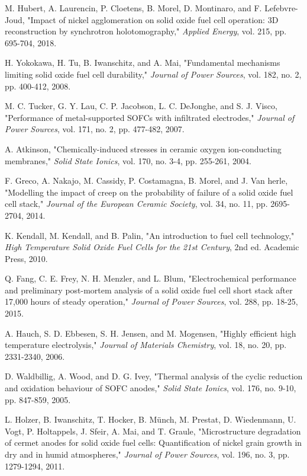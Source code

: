 \documentclass[conference]{IEEEtran}
\begin{document}
\begin{thebibliography}{99}
M. Hubert, A. Laurencin, P. Cloetens, B. Morel, D. Montinaro, and F. Lefebvre-Joud, "Impact of nickel agglomeration on solid oxide fuel cell operation: 3D reconstruction by synchrotron holotomography," \textit{Applied Energy}, vol. 215, pp. 695-704, 2018.

H. Yokokawa, H. Tu, B. Iwanschitz, and A. Mai, "Fundamental mechanisms limiting solid oxide fuel cell durability," \textit{Journal of Power Sources}, vol. 182, no. 2, pp. 400-412, 2008.

M. C. Tucker, G. Y. Lau, C. P. Jacobson, L. C. DeJonghe, and S. J. Visco, "Performance of metal-supported SOFCs with infiltrated electrodes," \textit{Journal of Power Sources}, vol. 171, no. 2, pp. 477-482, 2007.

A. Atkinson, "Chemically-induced stresses in ceramic oxygen ion-conducting membranes," \textit{Solid State Ionics}, vol. 170, no. 3-4, pp. 255-261, 2004.

F. Greco, A. Nakajo, M. Cassidy, P. Costamagna, B. Morel, and J. Van herle, "Modelling the impact of creep on the probability of failure of a solid oxide fuel cell stack," \textit{Journal of the European Ceramic Society}, vol. 34, no. 11, pp. 2695-2704, 2014.

K. Kendall, M. Kendall, and B. Palin, "An introduction to fuel cell technology," \textit{High Temperature Solid Oxide Fuel Cells for the 21st Century}, 2nd ed. Academic Press, 2010.

Q. Fang, C. E. Frey, N. H. Menzler, and L. Blum, "Electrochemical performance and preliminary post-mortem analysis of a solid oxide fuel cell short stack after 17,000 hours of steady operation," \textit{Journal of Power Sources}, vol. 288, pp. 18-25, 2015.

A. Hauch, S. D. Ebbesen, S. H. Jensen, and M. Mogensen, "Highly efficient high temperature electrolysis," \textit{Journal of Materials Chemistry}, vol. 18, no. 20, pp. 2331-2340, 2006.

D. Waldbillig, A. Wood, and D. G. Ivey, "Thermal analysis of the cyclic reduction and oxidation behaviour of SOFC anodes," \textit{Solid State Ionics}, vol. 176, no. 9-10, pp. 847-859, 2005.

L. Holzer, B. Iwanschitz, T. Hocker, B. Münch, M. Prestat, D. Wiedenmann, U. Vogt, P. Holtappels, J. Sfeir, A. Mai, and T. Graule, "Microstructure degradation of cermet anodes for solid oxide fuel cells: Quantification of nickel grain growth in dry and in humid atmospheres," \textit{Journal of Power Sources}, vol. 196, no. 3, pp. 1279-1294, 2011.


\end{thebibliography}
\end{document}
